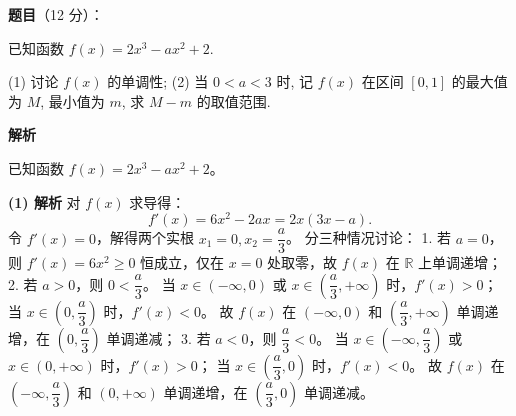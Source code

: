 \begin{answer}

\textbf{题目}（12 分）：

已知函数 $f(x) = 2x^3 - ax^2 + 2$.

(1) 讨论 $f(x)$ 的单调性;  
(2) 当 $0 < a < 3$ 时, 记 $f(x)$ 在区间 $[0, 1]$ 的最大值为 $M$, 最小值为 $m$, 求 $M - m$ 的取值范围.

\textbf{解析}

已知函数 $f(x) = 2x^3 - ax^2 + 2$。

\textbf{(1) 解析}
对 $f(x)$ 求导得：
\nopagebreak[4]
\[f'(x) = 6x^2 - 2ax = 2x(3x - a).\]
令 $f'(x) = 0$，解得两个实根 $x_1 = 0, x_2 = \dfrac{a}{3}$。
分三种情况讨论：
1. 若 $a = 0$，则 $f'(x) = 6x^2 \geqslant 0$ 恒成立，仅在 $x = 0$ 处取零，故 $f(x)$ 在 $\mathbb{R}$ 上单调递增；
2. 若 $a > 0$，则 $0 < \dfrac{a}{3}$。
   当 $x \in (-\infty, 0)$ 或 $x \in \left(\dfrac{a}{3}, +\infty\right)$ 时，$f'(x) > 0$；
   当 $x \in \left(0, \dfrac{a}{3}\right)$ 时，$f'(x) < 0$。
   故 $f(x)$ 在 $(-\infty, 0)$ 和 $\left(\dfrac{a}{3}, +\infty\right)$ 单调递增，在 $\left(0, \dfrac{a}{3}\right)$ 单调递减；
3. 若 $a < 0$，则 $\dfrac{a}{3} < 0$。
   当 $x \in \left(-\infty, \dfrac{a}{3}\right)$ 或 $x \in (0, +\infty)$ 时，$f'(x) > 0$；
   当 $x \in \left(\dfrac{a}{3}, 0\right)$ 时，$f'(x) < 0$。
   故 $f(x)$ 在 $\left(-\infty, \dfrac{a}{3}\right)$ 和 $(0, +\infty)$ 单调递增，在 $\left(\dfrac{a}{3}, 0\right)$ 单调递减。


\end{answer}
